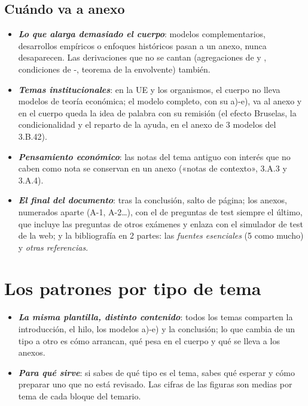 \documentclass[11pt]{article}
\begin{document}
\subsection{Cuándo va a anexo}\label{sec:anexo}

\begin{itemize}
\item \textbf{\emph{Lo que alarga demasiado el cuerpo}}: modelos complementarios, desarrollos empíricos o enfoques históricos pasan a un anexo, nunca desaparecen. Las derivaciones que no se cantan (agregaciones de  y , condiciones de -, teorema de la envolvente) también.
\item \textbf{\emph{Temas institucionales}}: en la UE y los organismos, el cuerpo no lleva modelos de teoría económica; el modelo completo, con su a)-e), va al anexo y en el cuerpo queda la idea de palabra con su remisión (el efecto Bruselas, la condicionalidad y el reparto de la ayuda, en el anexo de 3 modelos del 3.B.42).
\item \textbf{\emph{Pensamiento económico}}: las notas del tema antiguo con interés que no caben como nota se conservan en un anexo («notas de contexto», 3.A.3 y 3.A.4).
\item \textbf{\emph{El final del documento}}: tras la conclusión, salto de página; los anexos, numerados aparte (A-1, A-2…), con el de preguntas de test siempre el último, que incluye las preguntas de otros exámenes y enlaza con el simulador de test de la web; y la bibliografía en 2 partes: las \emph{fuentes esenciales} (5 como mucho) y \emph{otras referencias}.
\end{itemize}

\section{Los patrones por tipo de tema}\label{sec:tipos}

\begin{itemize}
\item \textbf{\emph{La misma plantilla, distinto contenido}}: todos los temas comparten la introducción, el hilo, los modelos a)-e) y la conclusión; lo que cambia de un tipo a otro es cómo arrancan, qué pesa en el cuerpo y qué se lleva a los anexos.
\item \textbf{\emph{Para qué sirve}}: si sabes de qué tipo es el tema, sabes qué esperar y cómo preparar uno que no está revisado. Las cifras de las figuras son medias por tema de cada bloque del temario.
\end{itemize}
\end{document}
